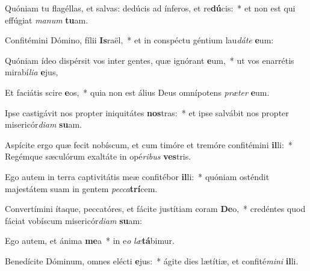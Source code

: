 \item Quóniam tu flagéllas, et salvas: dedúcis ad ínferos, et re\textbf{dú}cis:~* et non est qui effúgiat \textit{ma}\textit{num} \textbf{tu}am.
\item Confitémini Dómino, fílii \textbf{Is}raël,~* et in conspéctu géntium lau\textit{dá}\textit{te} \textbf{e}um:
\item Quóniam ídeo dispérsit vos inter gentes, quæ ignórant \textbf{e}um,~* ut vos enarrétis mirabí\textit{li}\textit{a} \textbf{e}jus,
\item Et faciátis scire \textbf{e}os,~* quia non est álius Deus omnípotens \textit{præ}\textit{ter} \textbf{e}um.
\item Ipse castigávit nos propter iniquitátes \textbf{nos}tras:~* et ipse salvábit nos propter misericór\textit{di}\textit{am} \textbf{su}am.
\item Aspícite ergo quæ fecit nobíscum, et cum timóre et tremóre confitémini \textbf{il}li:~* Regémque sæculórum exaltáte in opé\textit{ri}\textit{bus} \textbf{ves}tris.
\item Ego autem in terra captivitátis meæ confitébor \textbf{il}li:~* quóniam osténdit majestátem suam in gentem \textit{pec}\textit{ca}\textbf{trí}cem.
\item Convertímini ítaque, peccatóres, et fácite justítiam coram \textbf{De}o,~* credéntes quod fáciat vobíscum misericór\textit{di}\textit{am} \textbf{su}am:
\item Ego autem, et ánima \textbf{me}a~* in e\textit{o} \textit{læ}\textbf{tá}bimur.
\item Benedícite Dóminum, omnes elécti \textbf{e}jus:~* ágite dies lætítiæ, et confité\textit{mi}\textit{ni} \textbf{il}li.
